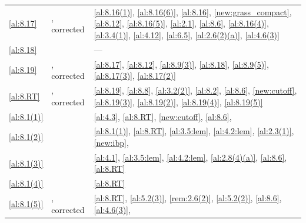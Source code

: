 \begin{center}
\begin{longtable}{p{}p{}p{}}
\ref{al:8.17} & \cite[8.17]{Allard1972}, corrected & \ref{al:8.16(1)}, \ref{al:8.16(6)}, \ref{al:8.16}, \ref{new:grass_compact}, \ref{al:8.12}, \ref{al:8.16(5)}, \ref{al:2.1}, \ref{al:8.6}, \ref{al:8.16(4)}, \ref{al:3.4(1)}, \ref{al:4.12}, \ref{al:6.5}, \ref{al:2.6(2)(a)}, \ref{al:4.6(3)} \\
\ref{al:8.18} & \cite[8.18]{Allard1972} & --- \\
\ref{al:8.19} & \cite[8.19]{Allard1972}, corrected & \ref{al:8.17}, \ref{al:8.12}, \ref{al:8.9(3)}, \ref{al:8.18}, \ref{al:8.9(5)}, \ref{al:8.17(3)}, \ref{al:8.17(2)} \\
\ref{al:8.RT} & \cite[section~8, Regularity Theorem]{Allard1972}, corrected & \ref{al:8.19}, \ref{al:8.8}, \ref{al:3.2(2)}, \ref{al:8.2}, \ref{al:8.6}, \ref{new:cutoff}, \ref{al:8.19(3)}, \ref{al:8.19(2)}, \ref{al:8.19(4)}, \ref{al:8.19(5)} \\
\ref{al:8.1(1)} & \cite[8.1(1)]{Allard1972} & \ref{al:4.3}, \ref{al:8.RT}, \ref{new:cutoff}, \ref{al:8.6}, \cite[2.2.5, 2.4.7, 2.4.9, 2.4.14]{Federer1969} \\
\ref{al:8.1(2)} & \cite[8.1(2)]{Allard1972} & \ref{al:8.1(1)}, \ref{al:8.RT}, \ref{al:3.5:lem}, \ref{al:4.2:lem}, \ref{al:2.3(1)}, \ref{new:ibp}, \cite[3.2.3]{Federer1969} \\
\ref{al:8.1(3)} & \cite[8.1(3)]{Allard1972} & \ref{al:4.1}, \ref{al:3.5:lem}, \ref{al:4.2:lem}, \ref{al:2.8(4)(a)}, \ref{al:8.6}, \ref{al:8.RT} \\
\ref{al:8.1(4)} & \cite[8.1(4)]{Allard1972} & \ref{al:8.RT} \\
\ref{al:8.1(5)} & \cite[8.1(5)]{Allard1972}, corrected & \ref{al:8.RT}, \ref{al:5.2(3)}, \ref{rem:2.6(2)}, \ref{al:5.2(2)}, \ref{al:8.6}, \ref{al:4.6(3)}, \cite[3.2.13]{Federer1969} \\
\end{longtable}
\end{center}
